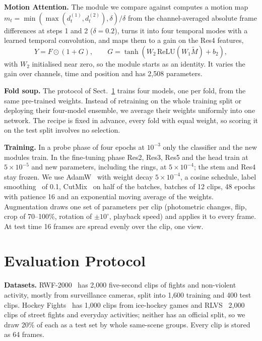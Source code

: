 \documentclass[runningheads]{llncs}
\begin{document}
\textbf{Motion Attention.} The module we compare against computes a motion
map $m_t=\min(\max(d^{(1)}_t, d^{(2)}_t),\delta)/\delta$ from the
channel-averaged absolute frame differences at steps 1 and 2
($\delta=0.2$), turns it into four temporal modes with a learned temporal
convolution, and maps them to a gain on the Res4 features,
\begin{equation}
  Y = F \odot (1+G), \qquad G = \tanh\!\left(W_2\,\mathrm{ReLU}(W_1 \tilde{M}) + b_2\right),
\end{equation}
with $W_2$ initialised near zero, so the module starts as an identity. It
varies the gain over channels, time and position and has 2{,}508
parameters.

\textbf{Fold soup.} The protocol of Sect.~\ref{sec:protocol} trains four
models, one per fold, from the same pre-trained weights. Instead of
retraining on the whole training split or deploying their four-model
ensemble, we average their weights uniformly into one network. The recipe
is fixed in advance, every fold with equal weight, so scoring it on the
test split involves no selection.

\textbf{Training.} In a probe phase of four epochs at $10^{-3}$ only the
classifier and the new modules train. In the fine-tuning phase Res2, Res3,
Res5 and the head train at $5\times10^{-5}$ and new parameters, including
the rings, at $5\times10^{-4}$; the stem and Res4 stay frozen. We use
AdamW~\cite{adamw} with weight decay $5\times10^{-4}$, a cosine schedule,
label smoothing~\cite{labelsmoothing} of 0.1, CutMix~\cite{cutmix} on half
of the batches, batches of 12 clips, 48 epochs with patience 16 and an
exponential moving average of the weights. Augmentation draws one set of
parameters per clip (photometric changes, flip, crop of 70--100\%, rotation
of $\pm10^\circ$, playback speed) and applies it to every frame. At test
time 16 frames are spread evenly over the clip, one view.

\section{Evaluation Protocol}
\label{sec:protocol}

\textbf{Datasets.} RWF-2000~\cite{rwf2000} has 2{,}000 five-second clips of
fights and non-violent activity, mostly from surveillance cameras, split
into 1{,}600 training and 400 test clips. Hockey Fights~\cite{hockey} has
1{,}000 clips from ice-hockey games and RLVS~\cite{rlvs} 2{,}000 clips of
street fights and everyday activities; neither has an official split, so we
draw 20\% of each as a test set by whole same-scene groups. Every clip is
stored as 64 frames.
\end{document}
